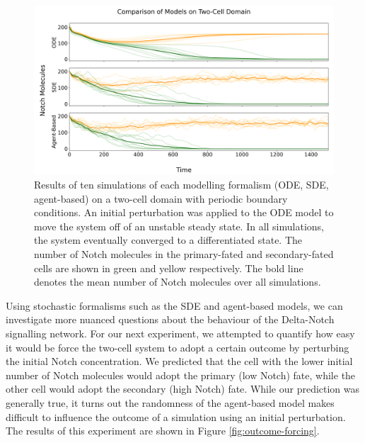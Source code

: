 \documentclass{article}
\begin{document}
\begin{flushleft}
\begin{figure}[!htp]
  \includegraphics[width=\textwidth]{img/vis123.png}
  \caption{Results of ten simulations of each modelling formalism (ODE, SDE, agent-based) on a two-cell domain with periodic boundary conditions. An initial perturbation was applied to the ODE model to move the system off of an unstable steady state. In all simulations, the system eventually converged to a differentiated state. The number of Notch molecules in the primary-fated and secondary-fated cells  are shown in green and yellow respectively. The bold line denotes the mean number of Notch molecules over all simulations.}
  \label{fig:two-cell-simulations}
\end{figure}

\medskip

Using stochastic formalisms such as the SDE and agent-based models, we can investigate more nuanced questions about the behaviour of the Delta-Notch signalling network. 
For our next experiment, we attempted to quantify how easy it would be force the two-cell system to adopt a certain outcome by perturbing the initial Notch concentration.
We predicted that the cell with the lower initial number of Notch molecules would adopt the primary (low Notch) fate, while the other cell would adopt the secondary (high Notch) fate.
While our prediction was generally true, it turns out the randomness of the agent-based model makes difficult to influence the outcome of a simulation using an initial perturbation.
The results of this experiment are shown in Figure \ref{fig:outcome-forcing}.


\end{flushleft}
\end{document}

